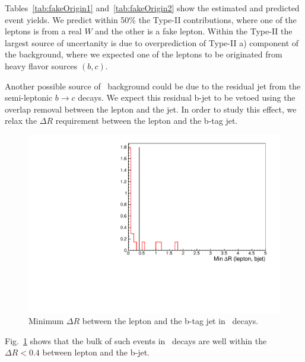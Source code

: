 Tables~\ref{tab:fakeOrigin1} and~\ref{tab:fakeOrigin2} show the estimated and predicted event yields. We predict within 50\% the Type-II contributions, where one of
the leptons is from a real $W$ and the other is a fake lepton. Within the Type-II the largest source of uncertanity is due to overprediction of Type-II a) 
component of the background, where we expected one of the leptons to be originated from heavy flavor sources $(b, c)$.

Another possible source of \ttbar\ background could be due to the residual jet from the semi-leptonic $b \rightarrow c$ decays. We expect this
residual b-jet to be vetoed using the overlap removal between the lepton and the jet. In order to study this effect, we relax the $\Delta R$
requirement between the lepton and the b-tag jet. 

\begin{figure}[htb]
\begin{center}
\includegraphics[width=0.6\linewidth, height=0.4\linewidth]{figs/bjetlepton.pdf}
\caption{ Minimum $\Delta R$ between the lepton and the b-tag jet in \ttbar\ decays.\label{fig:ttbar_residual}}
\end{center}
\end{figure}

Fig.~\ref{fig:ttbar_residual} shows that the bulk of such events in \ttbar\ decays are well within the $\Delta R < 0.4$ between lepton and the b-jet.



 




